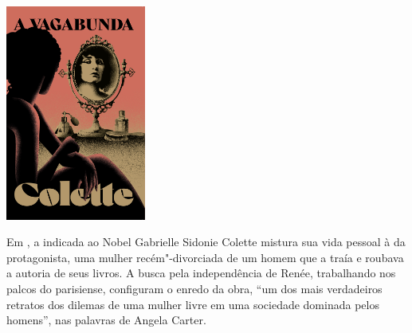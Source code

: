 \pagebreak

\hspace{.5cm}

\begin{center}
\hspace*{-.5cm}\includegraphics[width=46mm]{./imgs/vagabond.jpg}
\end{center}

\hspace*{-7cm}\hrulefill\hspace*{-7cm}

\medskip

\noindent{}Em {}, a indicada ao Nobel Gabrielle Sidonie Colette mistura sua vida pessoal à da protagonista, uma mulher recém"-divorciada de um homem que a traía e roubava a autoria de seus livros. A busca pela independência de Renée, trabalhando nos palcos do {} parisiense, configuram o enredo da obra, “um dos mais verdadeiros retratos dos dilemas de uma mulher livre em uma sociedade dominada pelos homens”, nas palavras de Angela Carter.

\vfill

\hspace*{-.4cm}\begin{minipage}[c]{1\linewidth}
\small{
{}}
\end{minipage}

